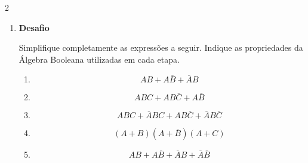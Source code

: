 \documentclass[a4paper,12pt]{article}
\begin{document}
\begin{multicols}{2}
\begin{enumerate}[leftmargin=*]
\begin{enumerate}[label=(\Alph*)]
    \item $\overline{A+BC}$

    \item $\overline{AB+C}$

    \item $\overline{(A+B)C}$

    \item $\overline{(A+B)(C+D)}$

\end{enumerate}

\vspace{0.5cm}


\item \textbf{Desafio}

Simplifique completamente as expressões a seguir. Indique as propriedades da
Álgebra Booleana utilizadas em cada etapa.

\begin{enumerate}[label=(\Alph*)]

    \item
    \[
        AB + A\overline{B} + \overline{A}B
    \]

    \item
    \[
        ABC + AB\overline{C} + A\overline{B}
    \]

    \item
    \[
        ABC + \overline{A}BC
        + AB\overline{C}
        + \overline{A}B\overline{C}
    \]

    \item
    \[
        (A+B)(A+\overline{B})(A+C)
    \]

    \item
    \[
        AB + A\overline{B}
        + \overline{A}B
        + \overline{A}\overline{B}
    \]

\end{enumerate}

\end{enumerate}

\end{multicols}

\vfill
\end{document}
